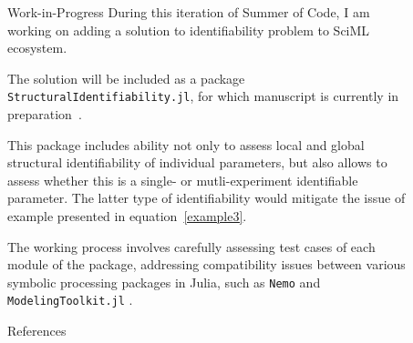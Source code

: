 \documentclass[final]{beamer}
\newlength{\sepwidth}
\newlength{\colwidth}
\newcommand{\separatorcolumn}{\begin{column}{\sepwidth}\end{column}}
\begin{document}
\begin{frame}[t]
\begin{columns}[t]
\begin{column}{\colwidth}
    \end{column}

    \separatorcolumn

    \begin{column}{\colwidth}

      \begin{block}{Work-in-Progress}
        During this iteration of Summer of Code, I am working on adding a solution to identifiability problem to SciML ecosystem.

        The solution will be included as a package {\tt StructuralIdentifiability.jl}, for which manuscript is currently in preparation~\cite{structidjl}.

        This package includes ability not only to assess local and global structural identifiability of individual parameters, but also allows to assess whether this is a single- or mutli-experiment identifiable parameter. The latter type of identifiability would mitigate the issue of example presented in equation~\ref{example3}.

        The working process involves carefully assessing test cases of each module of the package, addressing compatibility issues between various symbolic processing packages in Julia, such as {\tt Nemo} \cite{nemo} and {\tt ModelingToolkit.jl} \cite{ma2021modelingtoolkit}.
      \end{block}

      \begin{block}{References}
        \printbibliography{}
      \end{block}
    \end{column}
    \separatorcolumn{}
  \end{columns}
\end{frame}
\end{document}
